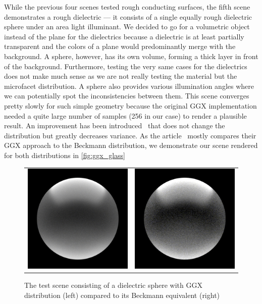 While the previous four scenes tested rough conducting surfaces, the fifth scene demonstrates a rough dielectric --- it consists of a single equally rough dielectric sphere under an area light illuminant. We decided to go for a volumetric object instead of the plane for the dielectrics because a dielectric is at least partially transparent and the colors of a plane would predominantly merge with the background. A sphere, however, has its own volume, forming a thick layer in front of the background. Furthermore, testing the very same cases for the dielectrics does not make much sense as we are not really testing the material but the microfacet distribution. A sphere also provides various illumination angles where we can potentially spot the inconsistencies between them. This scene converges pretty slowly for such simple geometry because the original GGX implementation needed a quite large number of samples (256 in our case) to render a plausible result. An improvement has been introduced~\cite{heitz2018sampling} that does not change the distribution but greatly decreases variance. As the article~\cite{walter2007microfacet} mostly compares their GGX approach to the Beckmann distribution, we demonstrate our scene rendered for both distributions in \autoref{fig:ggx_glass}

\begin{figure}[h]
	\begin{tabular}{cc}
		\includegraphics[width=.45\linewidth]{img/ggx_glass.png}
		&
		\includegraphics[width=.45\linewidth]{img/beckmann_glass.png}
	\end{tabular}
	\caption{The test scene consisting of a dielectric sphere with GGX distribution (left) compared to its Beckmann equivalent (right)}
	\label{fig:ggx_glass}
\end{figure}

